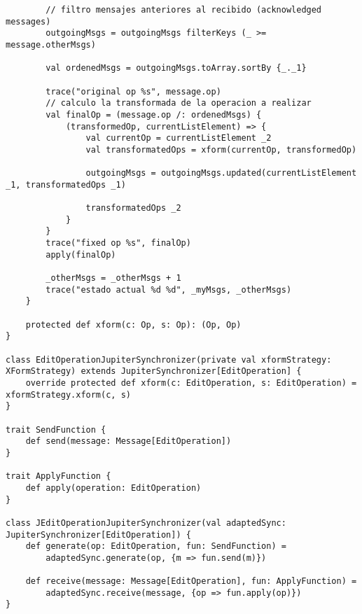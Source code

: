 {\begin{verbatim}
        // filtro mensajes anteriores al recibido (acknowledged messages)
        outgoingMsgs = outgoingMsgs filterKeys (_ >= message.otherMsgs)

        val ordenedMsgs = outgoingMsgs.toArray.sortBy {_._1}

        trace("original op %s", message.op)
        // calculo la transformada de la operacion a realizar
        val finalOp = (message.op /: ordenedMsgs) {
            (transformedOp, currentListElement) => {
                val currentOp = currentListElement _2
                val transformatedOps = xform(currentOp, transformedOp)

                outgoingMsgs = outgoingMsgs.updated(currentListElement _1, transformatedOps _1)

                transformatedOps _2
            }
        }
        trace("fixed op %s", finalOp)
        apply(finalOp)

        _otherMsgs = _otherMsgs + 1
        trace("estado actual %d %d", _myMsgs, _otherMsgs)
    }

    protected def xform(c: Op, s: Op): (Op, Op)
}

class EditOperationJupiterSynchronizer(private val xformStrategy: XFormStrategy) extends JupiterSynchronizer[EditOperation] {
    override protected def xform(c: EditOperation, s: EditOperation) = xformStrategy.xform(c, s)
}

trait SendFunction {
    def send(message: Message[EditOperation])
}

trait ApplyFunction {
    def apply(operation: EditOperation)
}

class JEditOperationJupiterSynchronizer(val adaptedSync: JupiterSynchronizer[EditOperation]) {
    def generate(op: EditOperation, fun: SendFunction) =
        adaptedSync.generate(op, {m => fun.send(m)})

    def receive(message: Message[EditOperation], fun: ApplyFunction) =
        adaptedSync.receive(message, {op => fun.apply(op)})
}
\end{verbatim}
}